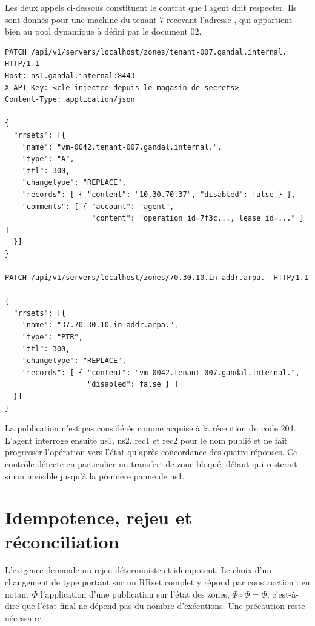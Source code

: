 \label{sec:publication}
Les deux appels ci-dessous constituent le contrat que l'agent doit respecter.
Ils sont donnés pour une machine du tenant 7 recevant l'adresse
, qui appartient bien au pool dynamique  à 
défini par le document 02.

\begin{lstlisting}[caption={Publication conjointe de l'enregistrement direct et
  de l'enregistrement inverse},label=lst:publication]
PATCH /api/v1/servers/localhost/zones/tenant-007.gandal.internal.  HTTP/1.1
Host: ns1.gandal.internal:8443
X-API-Key: <cle injectee depuis le magasin de secrets>
Content-Type: application/json

{
  "rrsets": [{
    "name": "vm-0042.tenant-007.gandal.internal.",
    "type": "A",
    "ttl": 300,
    "changetype": "REPLACE",
    "records": [ { "content": "10.30.70.37", "disabled": false } ],
    "comments": [ { "account": "agent",
                    "content": "operation_id=7f3c..., lease_id=..." } ]
  }]
}

PATCH /api/v1/servers/localhost/zones/70.30.10.in-addr.arpa.  HTTP/1.1

{
  "rrsets": [{
    "name": "37.70.30.10.in-addr.arpa.",
    "type": "PTR",
    "ttl": 300,
    "changetype": "REPLACE",
    "records": [ { "content": "vm-0042.tenant-007.gandal.internal.",
                   "disabled": false } ]
  }]
}
\end{lstlisting}

La publication n'est pas considérée comme acquise à la réception du code 204.
L'agent interroge ensuite ns1, ns2, rec1 et rec2 pour le nom publié et ne fait
progresser l'opération vers l'état  qu'après concordance
des quatre réponses. Ce contrôle détecte en particulier un transfert de zone
bloqué, défaut qui resterait sinon invisible jusqu'à la première panne de ns1.

\section{Idempotence, rejeu et réconciliation}
\label{sec:idempotence}

L'exigence  demande un rejeu déterministe et idempotent. Le
choix d'un changement de type  portant sur un RRset complet y
répond par construction : en notant $\Phi$ l'application d'une publication sur
l'état des zones, $\Phi \circ \Phi = \Phi$, c'est-à-dire que l'état final ne
dépend pas du nombre d'exécutions. Une précaution reste nécessaire.

